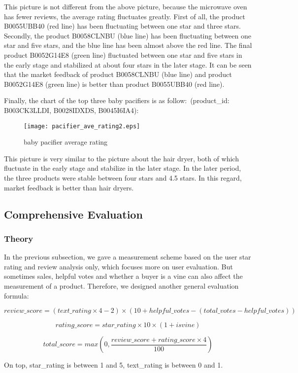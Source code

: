 \documentclass{mcmthesis}
\begin{document}
	    This picture is not different from the above picture, because the microwave oven has fewer reviews, the average rating fluctuates greatly. First of all, the product B0055UBB40 (red line) has been fluctuating between one star and three stars. Secondly, the product B0058CLNBU (blue line) has been fluctuating between one star and five stars, and the blue line has been almost above the red line. The final product B0052G14E8 (green line) fluctuated between one star and five stars in the early stage and stabilized at about four stars in the later stage. It can be seen that the market feedback of product B0058CLNBU (blue line) and product B0052G14E8 (green line) is better than product B0055UBB40 (red line).
	
	Finally, the chart of the top three baby pacifiers is as follow:\ (product\_id: B003CK3LLDI, B0028IDXDS, B0045I6IA4):
	\begin{figure}[H]
		\small
		\centering
		\texttt{[image: pacifier\_ave\_rating2.eps]}
		\caption{baby pacifier average rating} \label{fig:pacifier average rating}
	\end{figure}
	This picture is very similar to the picture about the hair dryer, both of which fluctuate in the early stage and stabilize in the later stage. In the later period, the three products were stable between four stars and 4.5 stars. In this regard, market feedback is better than hair dryers.
	
	\subsection{Comprehensive Evaluation}
	\subsubsection{Theory}
	In the previous subsection, we gave a measurement scheme based on the user star rating and review analysis only, which focuses more on user evaluation. But sometimes sales, helpful votes and whether a buyer is a vine can also affect the measurement of a product. Therefore, we designed another general evaluation formula:
	
	$$review\_score=(text\_rating\times4-2)\times(10+helpful\_votes-(total\_votes-helpful\_votes))$$
	
	$$rating\_score=star\_rating\times10\times(1+isvine)$$
	
	$$total\_score=max(0,\frac{review\_score+rating\_score\times4}{100})$$
	
	On top, star\_rating is between 1 and 5, text\_rating is between 0 and 1.
	
\end{document}
